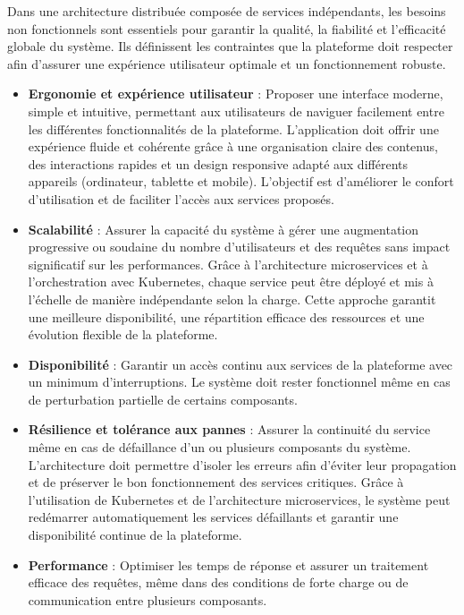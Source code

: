 Dans une architecture distribuée composée de services indépendants, les besoins non fonctionnels sont essentiels pour garantir la qualité, la fiabilité et l’efficacité globale du système. Ils définissent les contraintes que la plateforme doit respecter afin d’assurer une expérience utilisateur optimale et un fonctionnement robuste.

\begin{itemize}

\item \textbf{Ergonomie et expérience utilisateur} : Proposer une interface moderne, simple et intuitive, permettant aux utilisateurs de naviguer facilement entre les différentes fonctionnalités de la plateforme. L’application doit offrir une expérience fluide et cohérente grâce à une organisation claire des contenus, des interactions rapides et un design responsive adapté aux différents appareils (ordinateur, tablette et mobile). L’objectif est d’améliorer le confort d’utilisation et de faciliter l’accès aux services proposés.
\item \textbf{Scalabilité} : Assurer la capacité du système à gérer une augmentation progressive ou soudaine du nombre d’utilisateurs et des requêtes sans impact significatif sur les performances. Grâce à l’architecture microservices et à l’orchestration avec Kubernetes, chaque service peut être déployé et mis à l’échelle de manière indépendante selon la charge. Cette approche garantit une meilleure disponibilité, une répartition efficace des ressources et une évolution flexible de la plateforme.
    \item \textbf{Disponibilité} : Garantir un accès continu aux services de la plateforme avec un minimum d’interruptions. Le système doit rester fonctionnel même en cas de perturbation partielle de certains composants.

\item \textbf{Résilience et tolérance aux pannes} : Assurer la continuité du service même en cas de défaillance d’un ou plusieurs composants du système. L’architecture doit permettre d’isoler les erreurs afin d’éviter leur propagation et de préserver le bon fonctionnement des services critiques. Grâce à l’utilisation de Kubernetes et de l’architecture microservices, le système peut redémarrer automatiquement les services défaillants et garantir une disponibilité continue de la plateforme.
    \item \textbf{Performance} : Optimiser les temps de réponse et assurer un traitement efficace des requêtes, même dans des conditions de forte charge ou de communication entre plusieurs composants.


\end{itemize}
